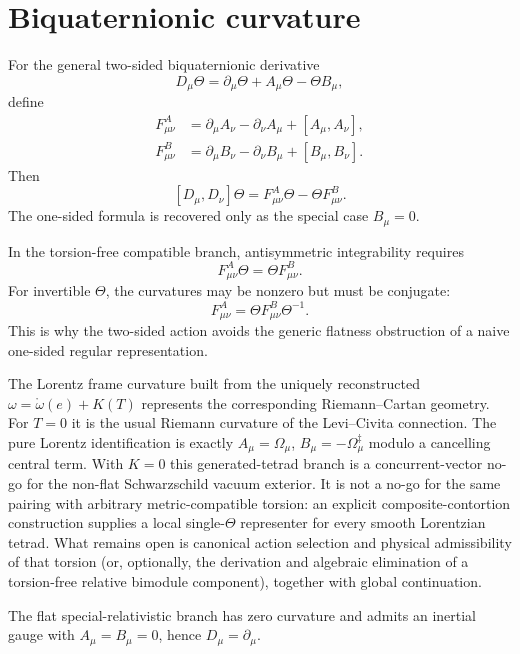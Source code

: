 
\section{Biquaternionic curvature}
\label{sec:canonical:biquaternion_curvature}

For the general two-sided biquaternionic derivative
\begin{equation}
 D_\mu\Theta=\partial_\mu\Theta+A_\mu\Theta-\Theta B_\mu,
\end{equation}
define
\begin{align}
 F^A_{\mu\nu}
 &=\partial_\mu A_\nu-\partial_\nu A_\mu+[A_\mu,A_\nu],\\
 F^B_{\mu\nu}
 &=\partial_\mu B_\nu-\partial_\nu B_\mu+[B_\mu,B_\nu].
\end{align}
Then
\begin{equation}
 \boxed{
 [D_\mu,D_\nu]\Theta
 =F^A_{\mu\nu}\Theta-\Theta F^B_{\mu\nu}.}
 \label{eq:canonical:bimodule-curvature}
\end{equation}
The one-sided formula is recovered only as the special case $B_\mu=0$.

In the torsion-free compatible branch, antisymmetric integrability requires
\begin{equation}
 F^A_{\mu\nu}\Theta=\Theta F^B_{\mu\nu}.
\end{equation}
For invertible $\Theta$, the curvatures may be nonzero but must be conjugate:
\begin{equation}
 F^A_{\mu\nu}=\Theta F^B_{\mu\nu}\Theta^{-1}.
\end{equation}
This is why the two-sided action avoids the generic flatness obstruction of a
naive one-sided regular representation.

The Lorentz frame curvature built from the uniquely reconstructed
$\omega=\mathring\omega(e)+K(T)$ represents the corresponding Riemann--Cartan
geometry.  For $T=0$ it is the usual Riemann curvature of the Levi--Civita
connection.  The pure Lorentz identification is exactly
$A_\mu=\Omega_\mu$, $B_\mu=-\Omega_\mu^\ddagger$ modulo a cancelling
central term.  With $K=0$ this generated-tetrad branch is a concurrent-vector
no-go for the non-flat Schwarzschild vacuum exterior.  It is not a no-go for
the same pairing with arbitrary metric-compatible torsion: an explicit
composite-contortion construction supplies a local single-$\Theta$ representer
for every smooth Lorentzian tetrad.  What remains open is canonical action
selection and physical admissibility of that torsion (or, optionally, the
derivation and algebraic elimination of a torsion-free relative bimodule
component), together with global continuation.

The flat special-relativistic branch has zero curvature and admits an inertial
gauge with $A_\mu=B_\mu=0$, hence $D_\mu=\partial_\mu$.
